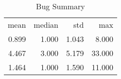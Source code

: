 \begin{table}[ht]
\centering
\caption{Bug Summary} 
\begin{tabular}{rrrr}
 mean & median & std & max \\ 
 0.899 & 1.000 & 1.043 & 8.000 \\ 
   \hline
4.467 & 3.000 & 5.179 & 33.000 \\ 
  1.464 & 1.000 & 1.590 & 11.000 \\ 
  \end{tabular}
\end{table}
